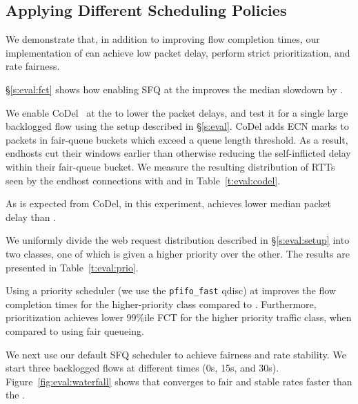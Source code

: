 \subsection{Applying Different Scheduling Policies}\label{s:eval:policies}
We demonstrate that, in addition to improving flow completion times, our implementation of \name can achieve low packet delay, perform strict prioritization, and rate fairness.

 \S\ref{s:eval:fct} shows how enabling SFQ at the \name improves the median slowdown by \overviewBenefitsBundlerMedianImprovement.

We enable CoDel~\cite{fq-codel} at the \inbox to lower the packet delays, and test it for a single large backlogged flow using the setup described in \S\ref{s:eval}.
CoDel adds ECN marks to packets in fair-queue buckets which exceed a queue length threshold. 
As a result, endhosts cut their windows earlier than otherwise reducing the self-inflicted delay within their fair-queue bucket.
We measure the resulting distribution of RTTs seen by the endhost connections with \name and \baseline in Table~\ref{t:eval:codel}.

As is expected from CoDel, \name in this experiment, achieves \delaysImprovement lower median packet delay than \baseline.

\label{s:eval:strictprio}
We uniformly divide the web request distribution described in \S\ref{s:eval:setup} into two classes, one of which is given a higher priority over the other. The results are presented in Table~\ref{t:eval:prio}.

Using a priority scheduler (we use the \texttt{pfifo\_fast} qdisc) at \inbox improves the flow completion times for the higher-priority class compared to \baseline.
Furthermore, prioritization achieves \strictPrioTailImprovementOverFq lower $99$\%ile FCT for the higher priority traffic class, when compared to using fair queueing.


\label{s:eval:waterfall}
We next use our default SFQ scheduler to achieve fairness and rate stability. We start three backlogged flows at different times (0s, 15s, and 30s). Figure~\ref{fig:eval:waterfall} shows that \name converges to fair and stable rates faster than the \baseline.


